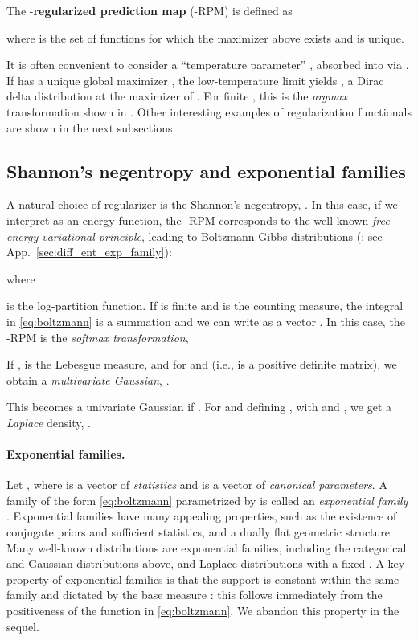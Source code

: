 \documentclass{article}
\newcommand{\remove}[1]{}
\begin{document}
\vspace{0.1cm}
\begin{definition}
\label{def:regularized_prediction}
The -\textbf{regularized prediction map} (-RPM)  is defined as

where  is the set of functions for which the maximizer above exists and is unique.
\end{definition}

It is often convenient to consider a ``temperature parameter'' , absorbed into  via . If  has a unique global maximizer , the low-temperature limit yields ,
a Dirac delta distribution at the maximizer of . 
For finite , this is the {\it argmax} transformation shown in \citep{blondel2020learning}. 
Other interesting examples of regularization functionals are shown in the next subsections.

\subsection{Shannon's negentropy and exponential families}

A natural choice of regularizer is the {Shannon's negentropy}, . 
In this case, if we interpret  as an energy function, the -RPM corresponds to the well-known {\it free energy variational principle}, leading to Boltzmann-Gibbs distributions (\citep{cover2012elements}; see App.~\ref{sec:diff_ent_exp_family}): 

where 

is the log-partition function. 
If  is finite and  is the counting measure, the integral in \eqref{eq:boltzmann} is a summation and we can write  as a vector . In this case, the -RPM is the {\it softmax transformation},

If ,  is the Lebesgue measure, and  for  and  (i.e.,  is a positive definite matrix), 
we obtain a {\it multivariate Gaussian}, . 
\remove{with Shannon negentropy .} 
This becomes a univariate Gaussian  if . 
For  and defining , with   and , we get a {\it Laplace} density, . \remove{, with Shannon negentropy .}




\paragraph{Exponential families.} 
Let , where  is a vector of \textit{statistics} and  is a vector of \textit{canonical parameters}. 
A family of the form \eqref{eq:boltzmann} parametrized by  is called an {\it exponential family} \citep{barndorff2014information}. 
Exponential families 
have many appealing properties, such as the existence of conjugate priors and sufficient statistics, and a dually flat geometric structure \citep{amari2016information}. Many well-known distributions are exponential families, including the categorical and Gaussian distributions above, and Laplace distributions with a fixed . 
A key property of exponential families is that the support is constant within the same family and dictated by the base measure : this follows immediately from the positiveness of the  function in \eqref{eq:boltzmann}. We abandon this property in the sequel.
\end{document}
